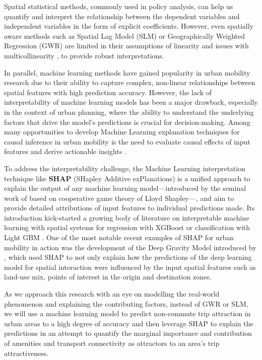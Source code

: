 Spatial statistical methods, commonly used in policy analysis, can help us quantify and interpret the relationship between the dependent variables and independent variables in the form of explicit coefficients. However, even spatially aware methods such as Spatial Lag Model (SLM) or Geographically Weighted Regression (GWR) are limited in their assumptions of linearity and issues with multicollinearity \citep{wheelerMulticollinearityCorrelationLocal2005}, to provide robust interpretations.

In parallel, machine learning methods have gained popularity in urban mobility research due to their ability to capture complex, non-linear relationships between spatial features with high prediction accuracy. However, the lack of interpretability of machine learning models has been a major drawback, especially in the context of urban planning, where the ability to understand the underlying factors that drive the model's predictions is crucial for decision-making. Among many opportunities to develop Machine Learning explanation techniques for causal inference in urban mobility is the need to evaluate causal effects of input features and derive actionable insights \citep{xinVisionPaperCausal2022}.

To address the interpretability challenge, the Machine Learning interpretation technique like \textbf{SHAP} (SHapley Additive exPlanations) is a unified approach to explain the output of any machine learning model---introduced by the seminal work of \citet{lundbergUnifiedApproachInterpreting2017a} based on cooperative game theory of Lloyd Shapley---, and aim to provide detailed attributions of input features to individual predictions made. Its introduction kick-started a growing body of literature on interpretable machine learning with spatial systems for regression with XGBoost \citep{liExtractingSpatialEffects2022} or classification with Light GBM \citep{louhichiShapleyValuesExplaining2023}. One of the most notable recent examples of SHAP for urban mobility in action was the development of the Deep Gravity Model introduced by \cite{siminiDeepGravityModel2021}, which used SHAP to not only explain how the predictions of the deep learning model for spatial interaction were influenced by the input spatial features such as land-use mix, points of interest in the origin and destination zones. 

As we approach this research with an eye on modelling the real-world phenomenon and explaining the contributing factors, instead of GWR or SLM, we will use a machine learning model to predict non-commute trip attraction in urban areas to a high degree of accuracy and then leverage SHAP to explain the predictions in an attempt to quantify the marginal importance and contribution of amenities and transport connectivity as attractors to an area's trip attractiveness.

